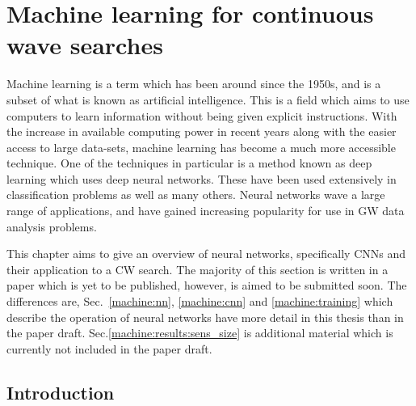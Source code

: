 \chapter[Machine learning for CWs]{\label{machine} Machine learning for continuous wave searches}


Machine learning is a term which has been around since the 1950s, and is a subset of what is known as artificial intelligence.
This is a field which aims to use computers to learn information without being given explicit instructions.
With the increase in available computing power in recent years along with the easier access to large data-sets, machine learning has become a much more accessible technique.
One of the techniques in particular is a method known as deep learning which uses deep neural networks.
These have been used extensively in classification problems as well as many others.
Neural networks wave a large range of applications, and have gained increasing popularity for use in \gls{GW} data analysis problems.

This chapter aims to give an overview of neural networks, specifically \glspl{CNN} and their application to a \gls{CW} search. 
The majority of this section is written in a paper which is yet to be published, however, is aimed to be submitted soon.
The differences are, Sec.~\ref{machine:nn}, \ref{machine:cnn} and \ref{machine:training} which describe the operation of neural networks have more detail in this thesis than in the paper draft. 
Sec.\ref{machine:results:sens_size} is additional material which is currently not included in the paper draft.


\section{\label{machine:intro} Introduction}

